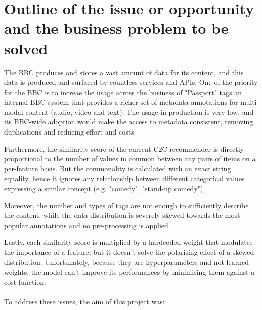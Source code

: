 
\section{Outline of the issue or opportunity and the business problem to be solved}

The BBC produces and stores a vast amount of data for its content, and this data is produced and surfaced by countless services and APIs.
One of the priority for the BBC is to increae the usage across the business of "Passport" tags \cite{BBC:PassportMetadata} an internal BBC
system that provides a richer set of metadata annotations for multi modal content (audio, video and text).
The usage in production is very low, and its BBC-wide adoption would make the access to metadata consistent,
removing duplications and reducing effort and costs.

Furthermore, the similarity score of the current C2C recommender is directly proportional to the number of values in common between any pairs of items
on a per-feature basis. But the commonality is calculated with an exact string equality, hence it ignores any relationship between different
categorical values expressing a similar concept (e.g. "comedy", "stand-up comedy").

Moreover, the number and types of tags are not enough to sufficiently
describe the content, while the data distribution is severely skewed towards the most popular annotations and no pre-processing
is applied.

Lastly, each similarity score is multiplied by a hardcoded weight that modulates the importance of a feature, but it doesn't solve
the polarising effect of a skewed distribution. Unfortunately, because they are hyperparameters and not learned weights, the model can't improve
its performances by minimising them against a cost function.
\\ \\
To address these issues, the aim of this project was:

